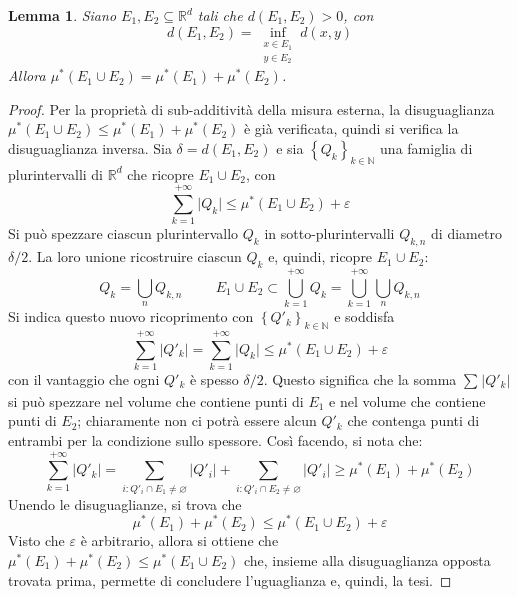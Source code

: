 \documentclass[11pt]{article}
\theoremstyle{style}
\newtheorem{lemma}{Lemma}[teorema]
\numberwithin{equation}{subsection}
\begin{document}
\begin{lemma}
	Siano $E_1, E_2\subseteq \mathbb{R}^d$ tali che $d(E_1,E_2) > 0$, con
	\[
	d(E_1,E_2) = \inf_{\substack{x \in E_1 \\ y \in E_2}} d(x,y) 
	\] 
	Allora $\mu ^*(E_1\cup E_2) = \mu ^*(E_1) + \mu ^*(E_2)$.
\end{lemma}
	\begin{proof}
		Per la propriet\`a di sub-additivit\`a della misura esterna, la disuguaglianza $\mu ^*(E_1\cup E_2) \le \mu ^*(E_1) + \mu ^*(E_2)$ \`e gi\`a verificata, quindi si verifica la disuguaglianza inversa.
		Sia $\delta = d(E_1,E_2)$ e sia $\left\{ Q_k \right\} _{k \in \mathbb{N}} $ una famiglia di plurintervalli di $\mathbb{R}^d$ che ricopre $E_1\cup E_2$, con 
		\[
			\sum_{k=1}^{+\infty} \lvert Q_k \rvert \le \mu ^*(E_1\cup E_2) + \varepsilon 
		\] 
		Si pu\`o spezzare ciascun plurintervallo $Q_k$ in sotto-plurintervalli $Q_{k,n} $ di diametro $\delta / 2$. La loro unione ricostruire ciascun $Q_k$ e, quindi, ricopre $E_1\cup E_2$:
		\[
		Q_k = \bigcup_{n} Q_{k,n} \hspace{1cm} E_1 \cup E_2 \subset \bigcup_{k=1} ^{+\infty}Q_k = \bigcup_{k=1} ^{+\infty} \bigcup_{n} Q_{k,n} 
	\] 
	Si indica questo nuovo ricoprimento con $\left\{ Q'_k \right\} _{k \in \mathbb{N}} $ e soddisfa
	\[
	\sum_{k=1}^{+\infty} \lvert Q'_k \rvert =\sum_{k=1}^{+\infty} \lvert Q_k \rvert \le \mu ^*(E_1\cup E_2) + \varepsilon 
	\] 
con il vantaggio che ogni $Q'_k$ \`e spesso $\delta / 2$.
Questo significa che la somma $\sum_{}^{} \lvert Q'_k \rvert $ si pu\`o spezzare nel volume che contiene punti di $E_1$ e nel volume che contiene punti di $E_2$; chiaramente non ci potr\`a essere alcun $Q'_k$ che contenga punti di entrambi per la condizione sullo spessore.
Cos\`i facendo, si nota che:
\[
\sum_{k=1}^{+\infty} \lvert Q'_k \rvert = \sum_{i : Q'_i\cap E_1 \neq \varnothing}^{} \lvert Q'_i \rvert + \sum_{i : Q'_i \cap E_2\neq \varnothing}^{} \lvert Q'_i \rvert \ge \mu ^*(E_1) + \mu ^*(E_2)
\] 
Unendo le disuguaglianze, si trova che
\[
\mu ^*(E_1) + \mu ^*(E_2) \le \mu ^*(E_1\cup E_2) + \varepsilon 
\] 
Visto che $\varepsilon $ \`e arbitrario, allora si ottiene che $\mu ^*(E_1) + \mu ^*(E_2) \le \mu ^*(E_1\cup E_2)$ che, insieme alla disuguaglianza opposta trovata prima, permette di concludere l'uguaglianza e, quindi, la tesi.
	\end{proof}
\end{document}
